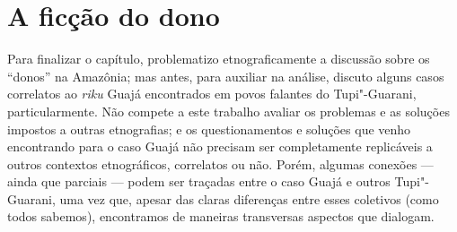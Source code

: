 \section{A ficção do dono}

Para finalizar o capítulo, problematizo etnograficamente a discussão
sobre os ``donos'' na Amazônia; mas antes, para auxiliar na análise,
discuto alguns casos correlatos ao \emph{riku} Guajá encontrados em
povos falantes do Tupi"-Guarani, particularmente. Não compete a este
trabalho avaliar os problemas e as soluções impostos a outras
etnografias; e os questionamentos e soluções que venho encontrando para
o caso Guajá não precisam ser completamente replicáveis a outros
contextos etnográficos, correlatos ou não. Porém, algumas conexões ---
ainda que parciais --- podem ser traçadas entre o caso Guajá e outros
Tupi"-Guarani, uma vez que, apesar das claras diferenças entre esses
coletivos (como todos sabemos), encontramos de maneiras transversas
aspectos que dialogam.

